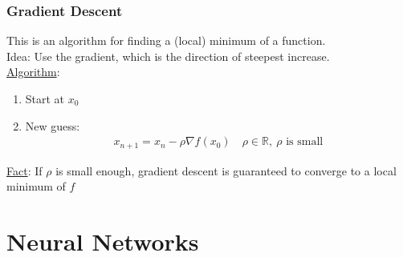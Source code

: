 \documentclass[12pt, letterpaper]{article}
\begin{document}
\subsubsection{Gradient Descent}
This is an algorithm for finding a (local) minimum of a function. \\
Idea: Use the gradient, which is the direction of steepest increase. \\
\underline{Algorithm}:
\begin{enumerate}
    \item Start at $x_0$
    \item New guess: \begin{align*}
        x_{n+1} = x_n - \rho\nabla f(x_0)\quad \rho \in \mathbb{R},\ \rho \text{ is small}
    \end{align*}
\end{enumerate}
\underline{Fact}: If $\rho$ is small enough, gradient descent is guaranteed to 
converge to a local minimum of $f$

\section{Neural Networks}
\end{document}
